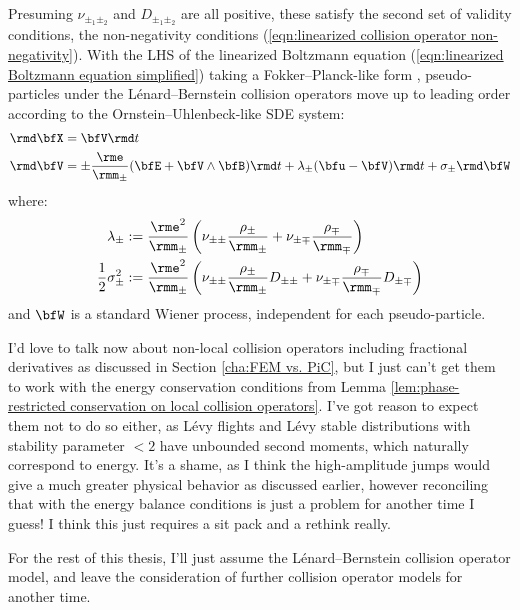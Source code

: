     Presuming $\nu_{\pm_{1}\pm_{2}}$ and $D_{\pm_{1}\pm_{2}}$ are all positive, these satisfy the second set of validity conditions, the non-negativity conditions (\ref{eqn:linearized collision operator non-negativity}). With the LHS of the linearized Boltzmann equation (\ref{eqn:linearized Boltzmann equation simplified}) taking a Fokker--Planck-like form \cite{Fokker_1914, Planck_1917}, pseudo-particles under the Lénard--Bernstein collision operators move up to leading order according to the Ornstein--Uhlenbeck-like \cite{Gardiner_1985, Karatzas_Shreve_1991, Gard_1998} SDE system:
    \begin{align}
        \rmd\bfX  &=  \bfV\rmd t  \label{eqn:particle motion SDE}  \\
        \rmd\bfV  &=  \pm\frac{\rme}{\rmm_{\pm}}(\bfE + \bfV\wedge\bfB)\rmd t + \lambda_{\pm}(\bfu - \bfV)\rmd t + \sigma_{\pm}\rmd\bfW  \label{eqn:particle forcing SDE}
    \end{align}
    where:
    \begin{align}
        \lambda_{\pm}                &:=  \frac{\rme^{2}}{\rmm_{\pm}}\left(\nu_{\pm\pm}\frac{\rho_{\pm}}{\rmm_{\pm}} + \nu_{\pm\mp}\frac{\rho_{\mp}}{\rmm_{\mp}}\right)  \\
        \frac{1}{2}\sigma_{\pm}^{2}  &:=  \frac{\rme^{2}}{\rmm_{\pm}}\left(\nu_{\pm\pm}\frac{\rho_{\pm}}{\rmm_{\pm}}D_{\pm\pm} + \nu_{\pm\mp}\frac{\rho_{\mp}}{\rmm_{\mp}}D_{\pm\mp}\right)
    \end{align}
    and $\bfW$ is a standard Wiener process, independent for each pseudo-particle.

    \begin{remark}
        I'd love to talk now about non-local collision operators including fractional derivatives as discussed in Section \ref{cha:FEM vs. PiC}, but I just can't get them to work with the energy conservation conditions from Lemma \ref{lem:phase-restricted conservation on local collision operators}. I've got reason to expect them not to do so either, as Lévy flights and Lévy stable distributions with stability parameter $< 2$ have unbounded second moments, which naturally correspond to energy. It's a shame, as I think the high-amplitude jumps would give a much greater physical behavior as discussed earlier, however reconciling that with the energy balance conditions is just a problem for another time I guess! I think this just requires a sit pack and a rethink really.

        For the rest of this thesis, I'll just assume the Lénard--Bernstein collision operator model, and leave the consideration of further collision operator models for another time.
    \end{remark}
    